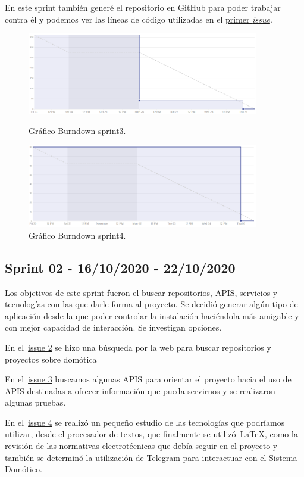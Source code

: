 En este sprint también generé el repositorio en GitHub para poder trabajar contra él y podemos ver las líneas de código utilizadas en el \href{https://github.com/davidelinformatico/TFG/issues/1}{primer \textit{issue}}.

\begin{figure}
    \centering
    \includegraphics[width=0.9\textwidth]{img/BurnDown/3.PNG}
    \caption{Gráfico Burndown sprint3. } \label{BD3}
    \includegraphics[width=0.9\textwidth]{img/BurnDown/4.PNG}
    \caption{Gráfico Burndown sprint4. } \label{BD4}
\end{figure}

\subsection{Sprint 02 - 16/10/2020 - 22/10/2020}
Los objetivos de este sprint fueron el buscar repositorios, APIS, servicios y tecnologías con las que darle forma al proyecto. Se decidió generar algún tipo de aplicación desde la que poder controlar la instalación haciéndola más amigable y con mejor capacidad de interacción. Se investigan opciones.

\item En el~\href{https://github.com/davidelinformatico/TFG/issues/2}{issue 2} se hizo una búsqueda por la web para buscar repositorios y proyectos sobre domótica
\item En el~\href{https://github.com/davidelinformatico/TFG/issues/3}{issue 3} buscamos algunas APIS para orientar el proyecto hacia el uso de APIS destinadas a ofrecer información que pueda servirnos y se realizaron algunas pruebas.
\item En el~\href{https://github.com/davidelinformatico/TFG/issues/4}{issue 4} se realizó un pequeño estudio de las tecnologías que podríamos utilizar, desde el procesador de textos, que finalmente se utilizó~\LaTeX{}, como la revisión de las normativas electrotécnicas que debía seguir en el proyecto y también se determinó la utilización de Telegram para interactuar con el Sistema Domótico.


